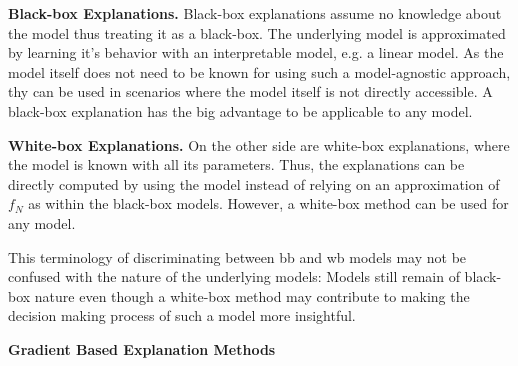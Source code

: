 \noindent\textbf{Black-box Explanations.} Black-box explanations assume no knowledge about the model thus treating it as a black-box. The underlying model is approximated by learning it's behavior with an interpretable model, e.g. a linear model. As the model itself does not need to be known for using such a model-agnostic approach, thy can be used in scenarios where the model itself is not directly accessible. A black-box explanation has the big advantage to be applicable to any model.


\noindent\textbf{White-box Explanations.} On the other side are white-box explanations, where the model is known with all its parameters. Thus, the explanations can be directly computed by using the model instead of relying on an approximation of $f_N$ as within the black-box models. 
However, a white-box method can be used for any model. 

This terminology of discriminating between bb and wb models may not be confused with the nature of the underlying models: Models still remain of black-box nature even though a white-box method may contribute to making the decision making process of such a model more insightful. %







\noindent\textbf{Gradient Based Explanation Methods}
